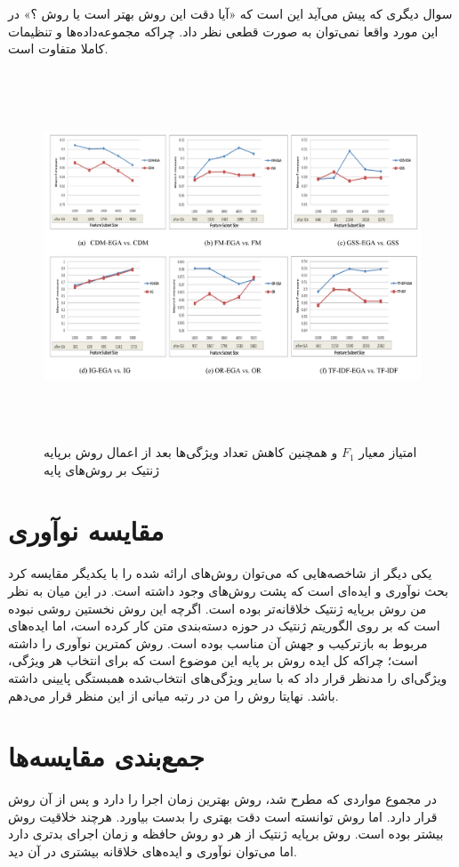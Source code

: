 سوال دیگری که پیش می‌آید این است که «آیا دقت این روش بهتر است یا روش  ؟» در این مورد واقعا نمی‌توان به صورت قطعی نظر داد. چراکه مجموعه‌داده‌ها و تنظیمات کاملا متفاوت است.

\begin{figure}[!h]
\includegraphics[height=11cm]{EGA1.png}
\caption{امتیاز معیار $F_1$ و همچنین کاهش تعداد ویژگی‌ها بعد از اعمال روش برپایه ژنتیک بر روش‌های پایه \cite{ghareb2016hybrid} }
\end{figure}

\section{مقایسه نوآوری}
یکی دیگر از شاخصه‌هایی که می‌توان روش‌های ارائه شده را با یکدیگر مقایسه کرد بحث نوآوری و ایده‌ای است که پشت روش‌های وجود داشته است. در این میان به نظر من روش برپایه ژنتیک خلاقانه‌تر بوده است. اگرچه این روش نخستین روشی نبوده است که بر روی الگوریتم ژنتیک در حوزه دسته‌بندی متن کار کرده است\cite{ghareb2016hybrid}، اما ایده‌های مربوط به بازترکیب و جهش آن مناسب بوده است. روش  کمترین نوآوری را داشته است؛ چراکه کل ایده روش بر پایه این موضوع است که برای انتخاب هر ویژگی، ویژگی‌ای را مدنظر قرار داد که با سایر ویژگی‌های انتخاب‌شده همبستگی پایینی داشته باشد. نهایتا روش  را من در رتبه میانی از این منظر قرار می‌دهم.

\section{جمع‌بندی مقایسه‌ها}
در مجموع مواردی که مطرح شد، روش  بهترین زمان اجرا را دارد و پس از آن روش  قرار دارد. اما روش  توانسته است دقت بهتری را بدست بیاورد. هرچند خلاقیت روش  بیشتر بوده است. روش برپایه ژنتیک از هر دو روش حافظه و زمان اجرای بدتری دارد اما می‌توان نوآوری و ایده‌های خلاقانه بیشتری در آن دید. 